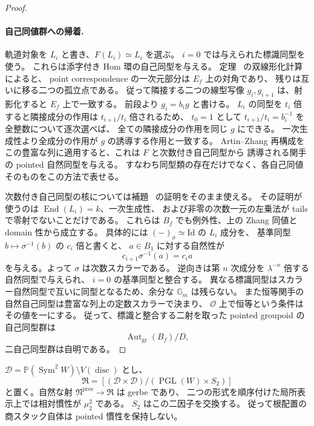 \begin{proof}
\paragraph{自己同値群への帰着.}
軌道対象を $L_i$ と書き、$F(L_i)\simeq L_i$ を選ぶ。
$i=0$ では与えられた標識同型を使う。
これらは添字付き Hom 環の自己同型を与える。
定理~\cite[\texttt{thm:ore-anticommuting-central}]{QuadricIntrinsic2026} の双線形化計算によると、
point correspondence の一次元部分は $E_f$ 上の対角であり、
残りは互いに移る二つの孤立点である。
従って隣接する二つの線型写像 $g_i,g_{i+1}$ は、射影化すると $E_f$ 上で一致する。
前段より $g_i=b_i g$ と書ける。
$L_i$ の同型を $t_i$ 倍すると隣接成分の作用は $t_{i+1}/t_i$ 倍されるため、
$t_0=1$ として $t_{i+1}/t_i=b_i^{-1}$ を全整数について逐次選べば、
全ての隣接成分の作用を同じ $g$ にできる。
一次生成性より全成分の作用が $g$ の誘導する作用と一致する。
Artin--Zhang 再構成をこの豊富な列に適用すると、これは $F$ と次数付き自己同型から
誘導される関手の pointed 自然同型を与える。
すなわち同型類の存在だけでなく、各自己同値そのものをこの方法で表せる。

次数付き自己同型の核については補題~\cite[\texttt{lem:scalar-tails}]{QuadricIntrinsic2026} の証明をそのまま使える。
その証明が使うのは $\operatorname{End}(L_i)=k$、一次生成性、
および非零の次数一元の左乗法が tails で零射でないことだけである。
これらは $B_f$ でも例外性、上の Zhang 同値と domain 性から成立する。
具体的には $(-)_\sigma\simeq\mathrm{Id}$ の $L_i$ 成分を、
基準同型 $b\mapsto\sigma^{-1}(b)$ の $c_i$ 倍と書くと、
$a\in B_1$ に対する自然性が
\[
 c_{i+1}\sigma^{-1}(a)=c_i a
\]
を与える。よって $\sigma$ は次数スカラーである。
逆向きは第 $n$ 次成分を $\lambda^{-n}$ 倍する自然同型で与えられ、
$i=0$ の基準同型と整合する。
異なる標識同型はスカラー自然同型で互いに同型となるため、余分な
$\mathbb G_m$ は残らない。
また恒等関手の自然自己同型は豊富な列上の定数スカラーで決まり、
$\mathcal O$ 上で恒等という条件はその値を一にする。
従って、標識と整合する二射を取った pointed groupoid の自己同型群は
\[
 \operatorname{Aut}_{\mathrm{gr}}(B_f)/D,
\]
二自己同型群は自明である。

\end{proof}

\begin{proposition}[根配置スタックへの射]
\label{prop:noncubic-sign-gerbe}
$\mathcal D=\mathbb P(\operatorname{Sym}^2W)\setminus V(\operatorname{disc})$ とし、
\[
 \mathfrak R=[(\mathcal D\times\mathcal D)/
       (\operatorname{PGL}(W)\times S_2)]
\]
と置く。自然な射 $\mathfrak N^{\mathrm{pres}}\to\mathfrak R$ は gerbe であり、
二つの形式を順序付けた局所表示上では相対慣性が $\mu_2^2$ である。
$S_2$ はこの二因子を交換する。
従って根配置の商スタック自体は pointed 慣性を保持しない。
\end{proposition}

